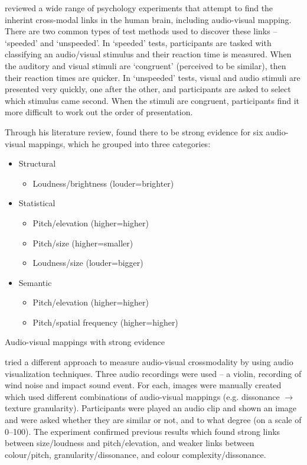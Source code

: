 \citet{Spence2011} reviewed a wide range of psychology experiments that attempt to find the inherint cross-modal links
in the human brain, including audio-visual mapping.  There are two common types of test methods used to discover these
links -- `speeded' and `unspeeded'.  In `speeded' tests, participants are tasked with classifying an audio/visual
stimulus and their reaction time is measured. When the auditory and visual stimuli are `congruent' (perceived to be
similar), then their reaction times are quicker. In `unspeeded' tests, visual and audio stimuli are presented very
quickly, one after the other, and participants are asked to select which stimulus came second. When the stimuli are
congruent, participants find it more difficult to work out the order of presentation.

Through his literature review, \citet{Spence2011} found there to be strong evidence for six audio-visual mappings,
which he grouped into three categories:

\begin{table}
{\singlespacing
\begin{itemize}
  \item Structural
  \begin{itemize}
    \item Loudness/brightness (louder=brighter)
  \end{itemize}
  \item Statistical
  \begin{itemize}
    \item Pitch/elevation (higher=higher)
    \item Pitch/size (higher=smaller)
    \item Loudness/size (louder=bigger)
  \end{itemize}
  \item Semantic
  \begin{itemize}
    \item Pitch/elevation (higher=higher)
    \item Pitch/spatial frequency (higher=higher)
  \end{itemize}
\end{itemize}
}
\caption{Audio-visual mappings with strong evidence}
\label{tab:crossmodal}
\end{table}

\citet{Tsiros2014} tried a different approach to measure audio-visual crossmodality by using audio visualization
techniques.  Three audio recordings were used -- a violin, recording of wind noise and impact sound event. For each,
images were manually created which used different combinations of audio-visual mappings (e.g. dissonance $\to$ texture
granularity). Participants were played an audio clip and shown an image and were asked whether they are similar or not,
and to what degree (on a scale of 0--100).  The experiment confirmed previous results which found strong links between
size/loudness and pitch/elevation, and weaker links between colour/pitch, granularity/dissonance, and colour
complexity/dissonance.

